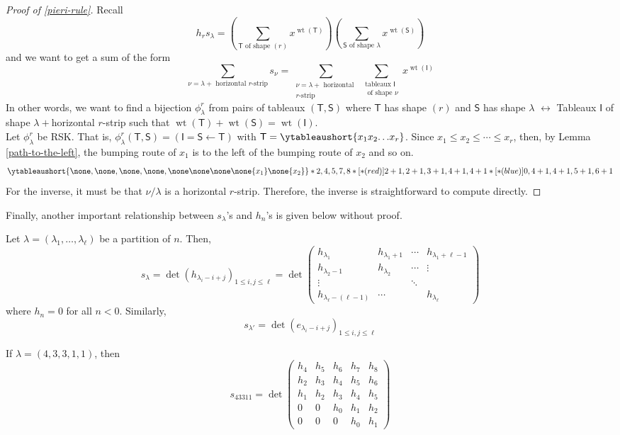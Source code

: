 \documentclass[11pt,leqno,oneside]{amsart}
\numberwithin{thm}{section}
\newcommand{\T}{\mathsf{T}} %
\renewcommand{\S}{\mathsf{S}}
\newcommand{\wt}{\operatorname{wt}}
\begin{document}
\begin{proof}[Proof of \ref{pieri-rule}]
  Recall \[
    h_r s_\lambda = \left( \sum_{\T \text{ of shape }(r)} x^{\wt(\T)}
    \right) \left( \sum_{\S \text{ of shape }\lambda} x^{\wt(\S)}\right)
  \]
  and we want to get a sum of the form \[
    \sum_{\nu = \lambda+\text{ horizontal }r\text{-strip}} s_\nu =
    \sum_{\substack{\nu = \lambda+\text{ horizontal }\\r\text{-strip}}}
    \sum_{\substack{\text{tableaux }\mathsf{I}\\\text{ of shape }\nu}} x^{\wt(\mathsf{I})}
  \]
  In other words, we want to find a bijection \(\phi_\lambda^r\) from
  pairs of tableaux \((\T,\S)\) where \(\T\) has shape \((r)\) and
  \(\S\) has shape \(\lambda\) \(\leftrightarrow\) Tableaux
  \(\mathsf{I}\) of shape \(\lambda+\)horizontal \(r\)-strip such that
  \(\wt(\T)+\wt(\S)=\wt(\mathsf{I})\).\\

  Let \(\phi_\lambda^r\) be RSK. That is, \(\phi_{\lambda}^r(\T,\S) =
  (\mathsf{I} = \S \leftarrow \T)\) with \(\T =
  \ytableaushort{{x_1}{x_2}{\dots}{x_r}}\). Since \(x_1 \leq x_2 \leq
  \cdots \leq x_r\), then, by Lemma \ref{path-to-the-left}, the
  bumping route of \(x_1\) is to the left of the bumping route of
  \(x_2\) and so on. \[
    \ytableaushort{\none,\none,\none,\none,\none\none\none\none{x_1}\none{x_2}}*{2,4,5,7,8}*[*(red)]{2+1,2+1,3+1,4+1,4+1}*[*(blue)]{0,4+1,4+1,5+1,6+1}
  \]
  For the inverse, it must be that \(\nu/\lambda\) is a horizontal
  \(r\)-strip. Therefore, the inverse is straightforward to compute
  directly.
\end{proof}
Finally, another important relationship between \(s_\lambda\)'s and
\(h_n\)'s is given below without proof.
\begin{thm}
  Let \(\lambda = (\lambda_1, \ldots, \lambda_\ell)\) be a
  partition of \(n\). Then, \[ 
    s_\lambda = \det(h_{\lambda_i-i+j})_{1 \leq i,j \leq \ell} = \det\left(
      \begin{array}{cccc}
        h_{\lambda_1} & h_{\lambda_1+1} & \cdots &
                                                   h_{\lambda_1+\ell-1}\\
        h_{\lambda_2-1} & h_{\lambda_2} & \cdots & \vdots \\
        \vdots & & \ddots & \\
        h_{\lambda_\ell-(\ell-1)} & \cdots & & h_{\lambda_\ell}
      \end{array}
    \right)
  \]
  where \(h_n = 0\) for all \(n < 0\). Similarly, \[
    s_{\lambda'} = \det(e_{\lambda_i-i+j})_{1 \leq i,j \leq \ell}
  \]
\end{thm}
\begin{example}
  If \(\lambda = (4,3,3,1,1)\), then \[
    s_{43311} = \det \left(
      \begin{array}{ccccc}
        h_4&h_5&h_6&h_7&h_8\\
        h_2&h_3&h_4&h_5&h_6\\
        h_1&h_2&h_3&h_4&h_5\\
        0&0&h_0&h_1&h_2\\
        0&0&0&h_0&h_1
      \end{array}
\right)
  \]
\end{example}
\end{document}
